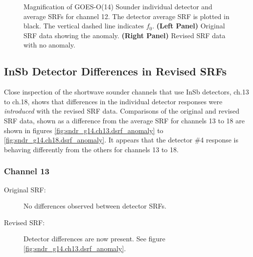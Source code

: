 \begin{figure}[htp]
\begin{tabular}{c c}
  \end{tabular}
  \caption{Magnification of GOES-O(14) Sounder individual detector and average SRFs for channel 12. The detector average SRF is plotted in black. The vertical dashed line indicates $f_0$. \textbf{(Left Panel)} Original SRF data showing the anomaly. \textbf{(Right Panel)} Revised SRF data with no anomaly.}
  \label{fig:sndr_g14.ch12.anomaly}
\end{figure}


\subsection{InSb Detector Differences in Revised SRFs}
Close inspection of the shortwave sounder channels that use InSb detectors, ch.13 to ch.18, shows that differences in the individual detector responses were \emph{introduced} with the revised SRF data. Comparisons of the original and revised SRF data, shown as a difference from the average SRF for channels 13 to 18 are shown in figures \ref{fig:sndr_g14.ch13.dsrf_anomaly} to \ref{fig:sndr_g14.ch18.dsrf_anomaly}. It appears that the detector \#4 response is behaving differently from the others for channels 13 to 18.

\subsubsection{Channel 13}
\begin{description}
  \item[Original SRF:] No differences observed between detector SRFs.
  \item[Revised SRF:]  Detector differences are now present. See figure \ref{fig:sndr_g14.ch13.dsrf_anomaly}.
\end{description}

